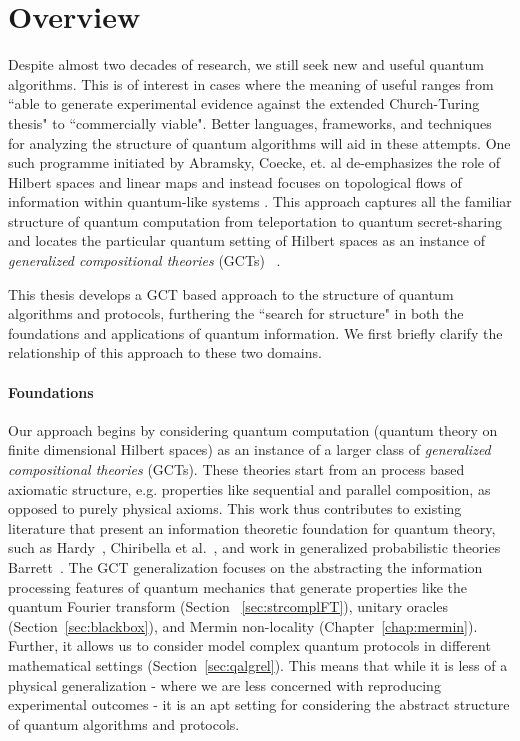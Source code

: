 \chapter{Overview}

Despite almost two decades of research, we still seek new and useful quantum algorithms.  This is of interest in cases where the meaning of useful ranges from ``able to generate experimental evidence against the extended Church-Turing thesis" to ``commercially viable". Better languages, frameworks, and techniques for analyzing the structure of quantum algorithms will aid in these attempts.  One such  programme initiated by Abramsky, Coecke, et. al de-emphasizes the role of Hilbert spaces and linear maps and instead focuses on topological flows of information within quantum-like systems
\cite{abramsky2008categorical,coecke2011interacting,coecke2013new}. This approach captures all the familiar structure of quantum computation from teleportation  to quantum secret-sharing and locates the particular quantum setting of Hilbert spaces as an instance of \emph{generalized compositional theories} (GCTs) ~\cite{coecke2015generalised,qcs-notes,coecke2011categories}. 

This thesis develops a GCT based approach to the structure of quantum algorithms and protocols, furthering the ``search for structure" in both the foundations and applications of quantum information. We first briefly clarify the relationship of this approach to these two domains.
 
\subsubsection*{Foundations}

Our approach begins by considering quantum computation (quantum theory on finite dimensional Hilbert spaces) as an instance of a larger class of \emph{generalized compositional theories} (GCTs). These theories start from an process based axiomatic structure, e.g. properties like sequential and parallel composition, as opposed to purely physical axioms. This work thus contributes to existing literature that present an information theoretic foundation for quantum theory, such as Hardy~\cite{hardy2001quantum}, Chiribella et al.~\cite{chiribella2011informational}, and work in generalized probabilistic theories Barrett~\cite{barrett2007information}.  The GCT generalization focuses on the abstracting the information processing features of quantum mechanics that generate properties like the quantum Fourier transform (Section ~\ref{sec:strcomplFT}), unitary oracles (Section~\ref{sec:blackbox}), and Mermin non-locality (Chapter~\ref{chap:mermin}). Further, it allows us to consider model complex quantum protocols in different mathematical settings (Section~\ref{sec:qalgrel}). This means that while it is less of a physical generalization - where we are less concerned
with reproducing experimental outcomes - it is an apt setting for considering the abstract structure of quantum algorithms and protocols.

